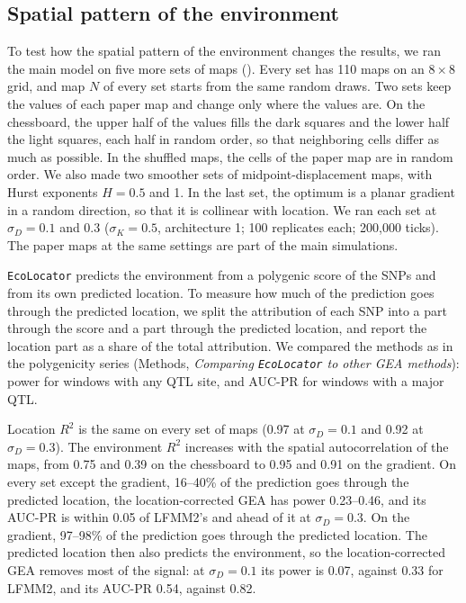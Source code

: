 \documentclass[]{article}
\newcommand{\ecolocator}{\texttt{EcoLocator}\xspace}
\begin{document}
\subsection*{Spatial pattern of the environment}

To test how the spatial pattern of the environment
changes the results,
we ran the main model on five more sets of maps ().
Every set has 110 maps on an $8 \times 8$ grid,
and map $N$ of every set starts from the same random draws.
Two sets keep the values of each paper map
and change only where the values are.
On the chessboard,
the upper half of the values fills the dark squares
and the lower half the light squares,
each half in random order,
so that neighboring cells differ as much as possible.
In the shuffled maps,
the cells of the paper map are in random order.
We also made two smoother sets of midpoint-displacement maps,
with Hurst exponents $H = 0.5$ and 1.
In the last set,
the optimum is a planar gradient in a random direction,
so that it is collinear with location.
We ran each set at $\sigma_D = 0.1$ and 0.3
($\sigma_K = 0.5$, architecture 1;
100 replicates each; 200,000 ticks).
The paper maps at the same settings are part of the main simulations.

\ecolocator predicts the environment from a polygenic score of the SNPs
and from its own predicted location.
To measure how much of the prediction goes through the predicted location,
we split the attribution of each SNP into a part through the score
and a part through the predicted location,
and report the location part as a share of the total attribution.
We compared the methods as in the polygenicity series
(Methods, \textit{Comparing \ecolocator to other GEA methods}):
power for windows with any QTL site,
and AUC-PR for windows with a major QTL.

Location $R^2$ is the same on every set of maps
(0.97 at $\sigma_D = 0.1$ and 0.92 at $\sigma_D = 0.3$).
The environment $R^2$ increases with the spatial autocorrelation
of the maps,
from 0.75 and 0.39 on the chessboard to 0.95 and 0.91 on the gradient.
On every set except the gradient,
16--40\% of the prediction goes through the predicted location,
the location-corrected GEA has power 0.23--0.46,
and its AUC-PR is within 0.05 of LFMM2's
and ahead of it at $\sigma_D = 0.3$.
On the gradient,
97--98\% of the prediction goes through the predicted location.
The predicted location then also predicts the environment,
so the location-corrected GEA removes most of the signal:
at $\sigma_D = 0.1$ its power is 0.07, against 0.33 for LFMM2,
and its AUC-PR 0.54, against 0.82.
\end{document}
